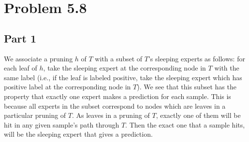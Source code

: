\documentclass{article}
\begin{document}
\section*{Problem 5.8}

\subsection*{Part 1}
We associate a pruning $h$ of $T$ with a subset of $T$'s sleeping experts as follows: for each leaf of $h$, take the sleeping expert at the corresponding node in $T$ with the same label (i.e., if the leaf is labeled positive, take the sleeping expert which has positive label at the corresponding node in $T$). We see that this subset has the property that exactly one expert makes a prediction for each sample. This is because all experts in the subset correspond to nodes which are leaves in a particular pruning of $T$. As leaves in a pruning of $T$, exactly one of them will be hit in any given sample's path through $T$. Then the exact one that a sample hits, will be the sleeping expert that gives a prediction.
\end{document}
